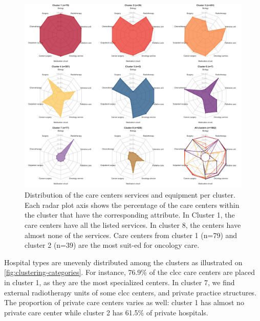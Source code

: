 \begin{figure}[h]
    \includegraphics[width=\textwidth]{images/camion/fig1_clusters_services.png}
    \centering
    \caption{
        Distribution of the care centers services and equipment per cluster. Each radar plot axis shows the percentage of the care centers within the cluster that have the corresponding attribute. In Cluster 1, the care centers have all the listed services. In cluster 8, the centers have almost none of the services. Care centers from cluster 1 (n=79) and cluster 2 (n=39) are the most suit-ed for oncology care.
    }
    \label{fig:clustering-spider}
\end{figure}

Hospital types are unevenly distributed among the clusters as illustrated on \cref{fig:clustering-categories}. For instance, 76.9\% of the \ac{clcc} care centers are placed in cluster 1, as they are the most specialized centers. In cluster 7, we find external radiotherapy units of some \ac{clcc} centers, and private practice structures. The proportion of private care centers varies as well: cluster 1 has almost no private care center while cluster 2 has 61.5\% of private hospitals.

